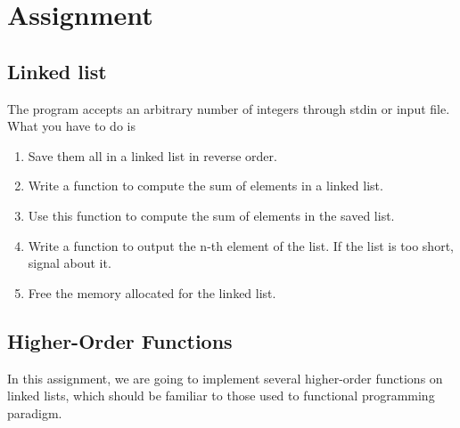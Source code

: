 \documentclass[12pt, a4paper]{article}
\begin{document}


\section*{Assignment}
\subsection*{Linked list}
The program accepts an arbitrary number of integers through stdin or input file. What you have to do is
\begin{enumerate}
  \item Save them all in a linked list in reverse order.
  \item Write a function to compute the sum of elements in a linked list.
  \item Use this function to compute the sum of elements in the saved list.
  \item Write a function to output the n-th element of the list. If the list is too  short, signal about it.
  \item Free the memory allocated for the linked list.
\end{enumerate}

\subsection*{Higher-Order Functions}
In this assignment, we are going to implement several higher-order functions on linked lists, which should 
be familiar to those used to functional programming paradigm.
\end{document}
